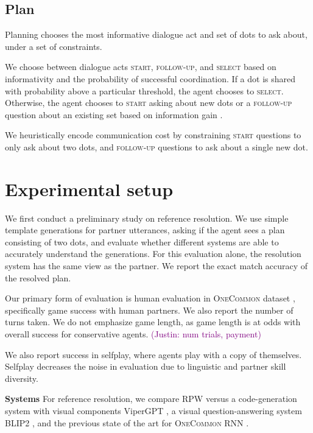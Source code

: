 \documentclass[11pt]{article}
\newcommand{\system}{RPW}
\newcommand{\justin}[1]{{{\textcolor{purple}{(Justin: #1)}}}}
\begin{document}
\subsection{Plan}
\label{sec:plan}
Planning chooses the most informative dialogue act and set of dots to ask about, under a set of constraints.

We choose between dialogue acts \textsc{start}, \textsc{follow-up}, and \textsc{select} based on informativity and the probability of successful coordination. If a dot is shared with probability above a particular threshold, the agent chooses to \textsc{select}.
Otherwise, the agent chooses to \textsc{start} asking about 
new dots or a \textsc{follow-up} question
about an existing set based on information gain \citep{lindley}.

We heuristically encode communication cost by constraining \textsc{start} questions to only ask about two dots, and \textsc{follow-up} questions
to ask about a single new dot.

\section{Experimental setup}
\label{sec:exp}

We first conduct a preliminary study on reference resolution.
We use simple template generations for partner utterances, asking if the agent sees a plan consisting of two dots,
and evaluate whether different systems are able to accurately understand the generations.
For this evaluation alone, the resolution system has the same view as the partner.
We report the exact match accuracy of the resolved plan.

Our primary form of evaluation is
human evaluation in \textsc{OneCommon} dataset \citep{onecommon},
specifically game success with human partners.
We also report the number of turns taken.
We do not emphasize game length, as game length is at odds with overall success
for conservative agents.
\justin{num trials, payment}

We also report success in selfplay, where agents play with a copy of themselves.
Selfplay decreases the noise in evaluation due to linguistic and partner skill diversity.


\textbf{Systems}
For reference resolution, we compare
\system{} versus a code-generation system with visual components ViperGPT \citep{vipergpt},
a visual question-answering system BLIP2 \citep{},
and the previous state of the art for \textsc{OneCommon} RNN \citep{fried}.
\end{document}
